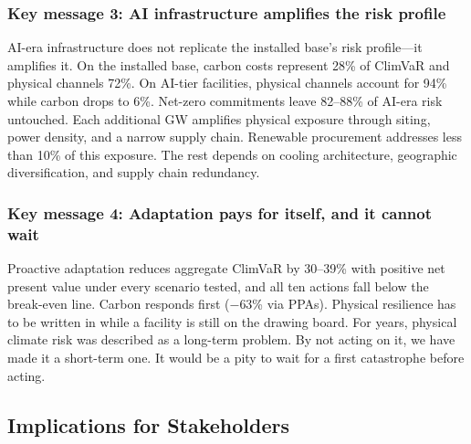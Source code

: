 \begin{twocolbody}
\columnbreak

\subsubsection*{Key message 3: AI infrastructure amplifies the risk profile}

AI-era infrastructure does not replicate the installed base's risk profile---it amplifies it. On the installed base, carbon costs represent 28\% of ClimVaR and physical channels 72\%. On AI-tier facilities, physical channels account for 94\% while carbon drops to 6\%. Net-zero commitments leave 82--88\% of AI-era risk untouched. Each additional GW amplifies physical exposure through siting, power density, and a narrow supply chain. Renewable procurement addresses less than 10\% of this exposure. The rest depends on cooling architecture, geographic diversification, and supply chain redundancy.

\subsubsection*{Key message 4: Adaptation pays for itself, and it cannot wait}

Proactive adaptation reduces aggregate ClimVaR by 30--39\% with positive net present value under every scenario tested, and all ten actions fall below the break-even line. Carbon responds first ($-$63\% via PPAs). Physical resilience has to be written in while a facility is still on the drawing board. For years, physical climate risk was described as a long-term problem. By not acting on it, we have made it a short-term one. It would be a pity to wait for a first catastrophe before acting.

\end{twocolbody}
\titlespacing*{\subsubsection}{0pt}{8pt}{3pt}

\clearpage

\subsection*{Implications for Stakeholders}\label{toc:implications}
\greensep

